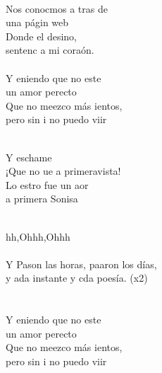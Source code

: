 \begin{cancion}%
{}\vspace*{-0.4cm}\\
	Nos conocmos a tras de  \\
	una págin web\\
	Donde el desino, \\
	sentenc a mi coraón. \\
\jump\\
	Y eniendo que no este \\
	un amor perecto\\
	Que no meezco más ientos, \\
	pero sin i no puedo viir\\\jump\\
	\begin{chorus}%
	Y eschame  \\
	¡Que no ue a primeravista!\\
	Lo estro fue un aor \\
	a primera Sonisa\\
	\end{chorus}%
	\jump\\
	hh,Ohhh,Ohhh       \\
\jump\\
	Y Pason las horas, paaron los días,\\
	y ada instante y cda poesía. (x2)\\
\jump\\
	    \\
	Y eniendo que no este \\
	un amor perecto\\
	Que no meezco más ientos, \\
	pero sin i no puedo viir\\\jump\\
	\begin{chorus}%

\end{chorus}
\end{cancion}
